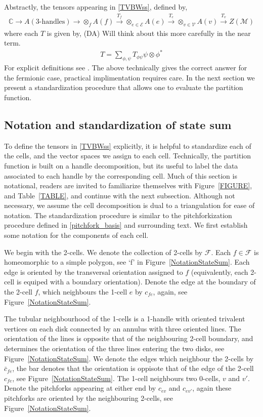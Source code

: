 \documentclass[12pt,a4paper]{article}
\newcounter{arrow}
\newcommand{\tp}{\otimes}
\newcommand{\ra}{\rightarrow}
\newcommand{\mce}{\mathcal{E}}
\newcommand{\cc}{\mathbb{C}}
\newcommand{\mcm}{\mathcal{M}}
\newcommand{\mcv}{\mathcal{V}}
\newcommand{\mcf}{\mathcal{F}}
\newcommand{\dave}[1]{{\color{ao(english)}\footnotesize{(DA) #1}}}
\begin{document}
Abstractly, the tensors appearing in \eqref{TVBWss}, 
defined by,
\begin{align}\nonumber
\cc \ra A(\text{3-handles}) \ra \tp_{f} A(f) \xrightarrow{T_f} \tp_{e \in \mce} A(e) \xrightarrow{T_e} \tp_{v \in \mcv} A(v) \xrightarrow{T_v} Z(\mcm)
\end{align}
where each $T$ is given by,
\dave{Will think about this more carefully in the near term.}
\begin{align}
T = \sum_{\phi, \psi}T_{\phi \psi}  \psi \tp \phi^*
\end{align}
For explicit definitions see \cite{Walker2006}.
The above technically gives the correct answer for the fermionic case, 
practical implimentation requires care.
In the next section we present a standardization procedure that allows one to evaluate the partition function.

\subsection{Notation and standardization of state sum}
To define the tensors in \eqref{TVBWss} explicitly, 
it is helpful to standardize each of the cells, 
and the vector spaces we assign to each cell. 
Technically, the partition function is built on a handle decomposition, 
but its useful to label the data associated to each handle by the corresponding cell. 
Much of this section is notational, 
readers are invited to familiarize themselves with Figure~\ref{FIGURE}, 
and Table~\ref{TABLE}, 
and continue with the next subsection. 
Although not necessary, we assume the cell decomposition is dual to a triangulation for ease of notation.
The standardization procedure is similar to the pitchforkization procedure defined in \eqref{pitchfork_basis} and surrounding text.
We first establish some notation for the components of each cell. 

We begin with the 2-cells.
We denote the collection of 2-cells by $\mcf$.
Each $f \in \mcf$ is homeomorphic to a simple polygon, see `f' in Figure~\ref{NotationStateSum}.
Each edge is oriented by the transversal orientation assigned to $f$ (equivalently, each 2-cell is equiped with a boundary orientation).
Denote the edge at the boundary of the 2-cell $f$, which neighbours the 1-cell $e$ by $c_{fe}$, again, see Figure~\ref{NotationStateSum}.

The tubular neighbourhood of the 1-cells is a 1-handle with oriented trivalent vertices on each disk connected by an annulus with three oriented lines.
The orientation of the lines is opposite that of the neighbouring 2-cell boundary, 
and determines the orientation of the three lines entering the two disks, see Figure~\ref{NotationStateSum}.
We denote the edges which neighbour the 2-cells by $\bar{c}_{fe}$, the bar denotes that the orientation is oppisote that of the edge of the 2-cell $c_{fe}$, see Figure~\ref{NotationStateSum}. 
The 1-cell neighbours two 0-cells, $v$ and $v'$. 
Denote the pitchforks appearing at either end by $c_{ev}$ and $c_{ev'}$, 
again these pitchforks are oriented by the neighbouring 2-cells, see Figure~\ref{NotationStateSum}.
\end{document}
